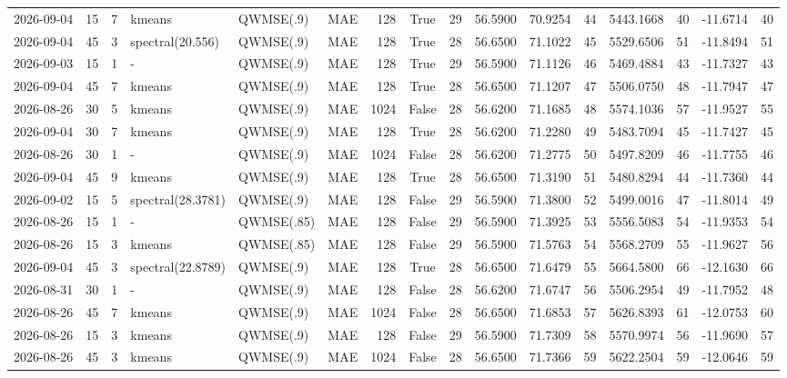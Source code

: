 \documentclass[10pt]{article}
\begin{document}
\begin{landscape}
\begin{longtable}{@{}lrrlllrcrrrrrrrr@{}}
2026-09-04 & 15 & 7 & kmeans & QWMSE(.9) & MAE & 128 & True & 29 & 56.5900 & 70.9254 & 44 & 5443.1668 & 40 & -11.6714 & 40 \\
2026-09-04 & 45 & 3 & spectral(20.556) & QWMSE(.9) & MAE & 128 & True & 28 & 56.6500 & 71.1022 & 45 & 5529.6506 & 51 & -11.8494 & 51 \\
2026-09-03 & 15 & 1 & - & QWMSE(.9) & MAE & 128 & True & 29 & 56.5900 & 71.1126 & 46 & 5469.4884 & 43 & -11.7327 & 43 \\
2026-09-04 & 45 & 7 & kmeans & QWMSE(.9) & MAE & 128 & True & 28 & 56.6500 & 71.1207 & 47 & 5506.0750 & 48 & -11.7947 & 47 \\
2026-08-26 & 30 & 5 & kmeans & QWMSE(.9) & MAE & 1024 & False & 28 & 56.6200 & 71.1685 & 48 & 5574.1036 & 57 & -11.9527 & 55 \\
2026-09-04 & 30 & 7 & kmeans & QWMSE(.9) & MAE & 128 & True & 28 & 56.6200 & 71.2280 & 49 & 5483.7094 & 45 & -11.7427 & 45 \\
2026-08-26 & 30 & 1 & - & QWMSE(.9) & MAE & 1024 & False & 28 & 56.6200 & 71.2775 & 50 & 5497.8209 & 46 & -11.7755 & 46 \\
2026-09-04 & 45 & 9 & kmeans & QWMSE(.9) & MAE & 128 & True & 28 & 56.6500 & 71.3190 & 51 & 5480.8294 & 44 & -11.7360 & 44 \\
2026-09-02 & 15 & 5 & spectral(28.3781) & QWMSE(.9) & MAE & 128 & False & 29 & 56.5900 & 71.3800 & 52 & 5499.0016 & 47 & -11.8014 & 49 \\
2026-08-26 & 15 & 1 & - & QWMSE(.85) & MAE & 128 & False & 29 & 56.5900 & 71.3925 & 53 & 5556.5083 & 54 & -11.9353 & 54 \\
2026-08-26 & 15 & 3 & kmeans & QWMSE(.85) & MAE & 128 & False & 29 & 56.5900 & 71.5763 & 54 & 5568.2709 & 55 & -11.9627 & 56 \\
2026-09-04 & 45 & 3 & spectral(22.8789) & QWMSE(.9) & MAE & 128 & True & 28 & 56.6500 & 71.6479 & 55 & 5664.5800 & 66 & -12.1630 & 66 \\
2026-08-31 & 30 & 1 & - & QWMSE(.9) & MAE & 128 & False & 28 & 56.6200 & 71.6747 & 56 & 5506.2954 & 49 & -11.7952 & 48 \\
2026-08-26 & 45 & 7 & kmeans & QWMSE(.9) & MAE & 1024 & False & 28 & 56.6500 & 71.6853 & 57 & 5626.8393 & 61 & -12.0753 & 60 \\
2026-08-26 & 15 & 3 & kmeans & QWMSE(.9) & MAE & 128 & False & 29 & 56.5900 & 71.7309 & 58 & 5570.9974 & 56 & -11.9690 & 57 \\
2026-08-26 & 45 & 3 & kmeans & QWMSE(.9) & MAE & 1024 & False & 28 & 56.6500 & 71.7366 & 59 & 5622.2504 & 59 & -12.0646 & 59 \\

\end{longtable}
\end{landscape}
\end{document}
